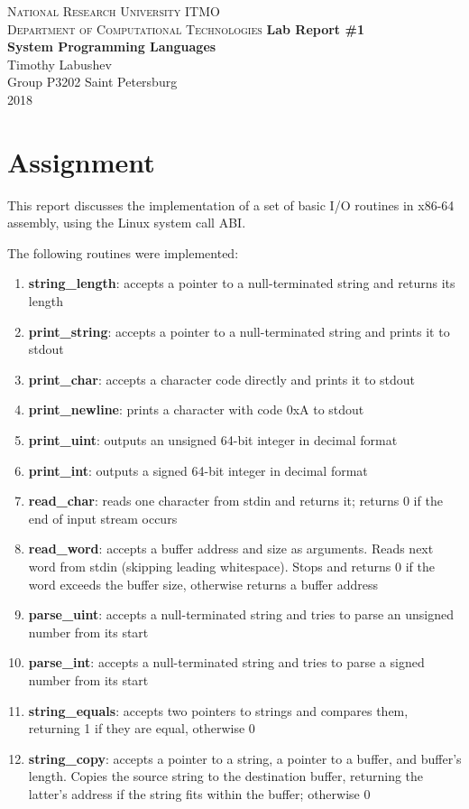 \documentclass[12pt,a4paper]{report}
\begin{document}
\begin{titlepage}
\begin{center}
\textsc{
  National Research University ITMO\\[4mm]
  Department of Computational Technologies
}
\vfill
\textbf{
  Lab Report \#1\\[2mm]
  System Programming Languages
  \\[20mm]
}
Timothy Labushev\\[2mm]
Group P3202
\vfill
Saint Petersburg\\[2mm]
2018
\end{center}
\end{titlepage}

\newpage
\section*{Assignment}

This report discusses the implementation of a set of basic I/O routines in x86-64 assembly, using the Linux system call ABI.

The following routines were implemented:

\begin{enumerate}
\setlength\itemsep{0.2em}
\item \textbf{string\_length}: accepts a pointer to a null-terminated string and returns its length
\item \textbf{print\_string}: accepts a pointer to a null-terminated string and prints it to stdout
\item \textbf{print\_char}: accepts a character code directly and prints it to stdout
\item \textbf{print\_newline}: prints a character with code 0xA to stdout
\item \textbf{print\_uint}: outputs an unsigned 64-bit integer in decimal format
\item \textbf{print\_int}: outputs a signed 64-bit integer in decimal format
\item \textbf{read\_char}: reads one character from stdin and returns it; returns 0 if the end of input stream occurs
\item \textbf{read\_word}: accepts a buffer address and size as arguments. Reads next word from stdin (skipping leading whitespace). Stops and returns 0 if the word exceeds the buffer size, otherwise returns a buffer address
\item \textbf{parse\_uint}: accepts a null-terminated string and tries to parse an unsigned number from its start
\item \textbf{parse\_int}: accepts a null-terminated string and tries to parse a signed number from its start
\item \textbf{string\_equals}: accepts two pointers to strings and compares them, returning 1 if they are equal, otherwise 0
\item \textbf{string\_copy}: accepts a pointer to a string, a pointer to a buffer, and buffer’s length. Copies the source string to the destination buffer, returning the latter's address if the string fits within the buffer; otherwise 0
\end{enumerate}
\end{document}
